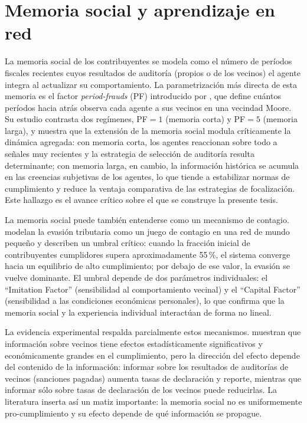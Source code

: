 \section{Memoria social y aprendizaje en red}
\label{sec:edo-memsoc}

La memoria social de los contribuyentes se modela como el número de períodos fiscales recientes cuyos resultados de auditoría (propios o de los vecinos) el agente integra al actualizar su comportamiento. La parametrización más directa de esta memoria es el factor \textit{period-frauds} (PF) introducido por \textcite{canessa2025tax}, que define cuántos períodos hacia atrás observa cada agente a sus vecinos en una vecindad Moore. Su estudio contrasta dos regímenes, PF$=1$ (memoria corta) y PF$=5$ (memoria larga), y muestra que la extensión de la memoria social modula críticamente la dinámica agregada: con memoria corta, los agentes reaccionan sobre todo a señales muy recientes y la estrategia de selección de auditoría resulta determinante; con memoria larga, en cambio, la información histórica se acumula en las creencias subjetivas de los agentes, lo que tiende a estabilizar normas de cumplimiento y reduce la ventaja comparativa de las estrategias de focalización. Este hallazgo es el avance crítico sobre el que se construye la presente tesis.

La memoria social puede también entenderse como un mecanismo de contagio. \textcite{dimauro2019contagion} modelan la evasión tributaria como un juego de contagio en una red de mundo pequeño y describen un umbral crítico: cuando la fracción inicial de contribuyentes cumplidores supera aproximadamente 55\,\%, el sistema converge hacia un equilibrio de alto cumplimiento; por debajo de ese valor, la evasión se vuelve dominante. El umbral depende de dos parámetros individuales: el ``Imitation Factor'' (sensibilidad al comportamiento vecinal) y el ``Capital Factor'' (sensibilidad a las condiciones económicas personales), lo que confirma que la memoria social y la experiencia individual interactúan de forma no lineal.

La evidencia experimental respalda parcialmente estos mecanismos. \textcite{alm2017neighbour} muestran que información sobre vecinos tiene efectos estadísticamente significativos y económicamente grandes en el cumplimiento, pero la dirección del efecto depende del contenido de la información: informar sobre los resultados de auditorías de vecinos (sanciones pagadas) aumenta tasas de declaración y reporte, mientras que informar sólo sobre tasas de declaración de los vecinos puede reducirlas. La literatura inserta así un matiz importante: la memoria social no es uniformemente pro-cumplimiento y su efecto depende de qué información se propague.

